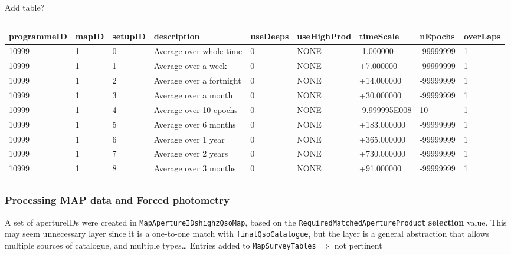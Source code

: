 \documentclass[usenatbib]{mnras}
\begin{document}
    Add table?
    \begin{table*}
      \begin{center}
        \setlength{\tabcolsep}{4pt}
        \begin{tabular}{ll lll lll l}
          \hline \hline
   programmeID &	mapID &	setupID  &	description               &	useDeeps  &	useHighProd &	timeScale	    &  nEpochs     &	overLaps\\
          \hline
10999	& 1 & 0 & Average over whole time & 0 &	NONE &	-1.000000 &	-99999999 &	1 \\
10999	& 1 & 1 & Average over a week &	0 & NONE & +7.000000 &	-99999999 &	1\\
10999	& 1 & 2	& Average over a fortnight & 0 & NONE &	+14.000000 & -99999999 & 1\\
10999	& 1 & 3	& Average over a month & 0 & NONE & +30.000000 & -99999999 & 1\\
10999	& 1 & 4	& Average over 10 epochs & 0 & NONE & -9.999995E008 & 10 & 1\\
10999	& 1 & 5 & Average over 6 months	& 0 & NONE & +183.000000 & -99999999 & 1 \\
10999	& 1 & 6	& Average over 1 year &	0 & NONE & +365.000000 & -99999999 & 1 \\
10999	& 1 & 7	& Average over 2 years & 0 & NONE & +730.000000	& -99999999 & 1 \\
10999	& 1 & 8 & Average over 3 months & 0 & NONE & +91.000000	& -99999999 & 1 \\
          \hline \hline
          \label{tab:The_Numbers}
        \end{tabular}
        \caption{}
      \end{center}
    \end{table*}
    
    
    \subsubsection{Processing MAP data and Forced photometry} 
    A set of apertureIDs were created in \verb+MapApertureIDshighzQsoMap+, based on
    the \verb+RequiredMatchedApertureProduct+ {\bf selection} value. This may
    seem unnecessary layer since it is a one-to-one match with \verb+finalQsoCatalogue+,
    but the layer is a general abstraction that allows multiple sources of
    catalogue, and multiple types\ldots
    Entries added to \verb+MapSurveyTables+ $\Rightarrow$ not pertinent
\end{document}
